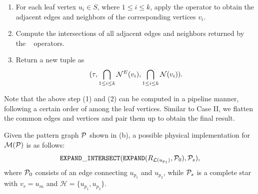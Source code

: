 \begin{enumerate}
\item For each leaf vertex $u_i \in S$, where $1 \leq i \leq k$, apply the  operator to obtain the adjacent edges and neighbors of the corresponding vertices $v_i$.
\item Compute the intersections of all adjacent edges and neighbors returned by the \expand~ operators.
\item Return a new tuple as
\[
    (\tau, \bigcap_{1 \leq i \leq k}{\mathcal{N}}^E(v_i), \bigcap_{1 \leq i \leq k}{\mathcal{N}}(v_i)).
\]
\end{enumerate}

Note that the above step (1) and (2) can be computed in a pipeline manner, following a certain order of among the leaf vertices.
Similar to Case II, we flatten the common edges and vertices and pair them up to obtain the final result.

\begin{example}
    Given the pattern graph $\mathcal{P}$ shown in (b), a possible physical implementation for $\mathcal{M}(\mathcal{P})$ is as follows:
    \begin{equation*}
        \texttt{EXPAND}\_\texttt{INTERSECT}({\texttt{EXPAND}}({R_{\mathcal{L}(u_{p_1})}}, \mathcal{P}_{0}), \mathcal{P}_{s}),
    \end{equation*}
    where $\mathcal{P}_{0}$ consists of an edge connecting $u_{p_1}$ and $u_{p_2}$, while $\mathcal{P}_{s}$ is a complete star with $v_r = u_m$ and $\mathcal{H} = \{u_{p_1}, u_{p_2}\}$.
\end{example}
